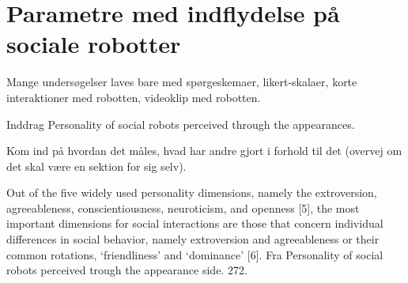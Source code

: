 \chapter{Parametre med indflydelse på sociale robotter}
\label{InteraktionSocialeRobotterOplevelse}
%












Mange undersøgelser laves bare med spørgeskemaer, likert-skalaer, korte interaktioner med robotten, videoklip med robotten. 

Inddrag Personality of social robots perceived through the appearances.

Kom ind på hvordan det måles, hvad har andre gjort i forhold til det (overvej om det skal være en sektion for sig selv).\blankline


Out of the five widely used personality dimensions, namely the extroversion, agreeableness, conscientiousness, neuroticism, and openness [5], the most important dimensions for social interactions are those that concern individual differences in social behavior, namely extroversion and agreeableness or their common rotations, ‘friendliness’ and ‘dominance’ [6]. Fra Personality of social robots perceived trough the appearance side. 272.
